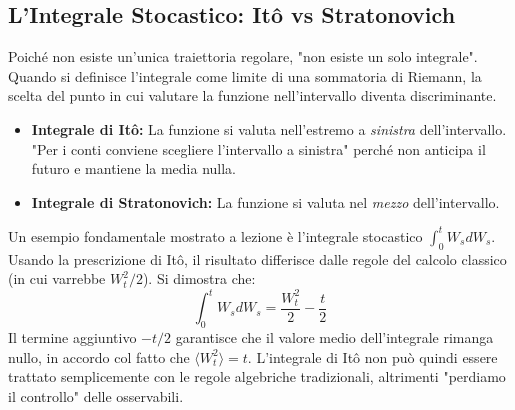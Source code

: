 \documentclass[12pt,a4paper]{article}
\begin{document}
\subsection{L'Integrale Stocastico: Itô vs Stratonovich}
Poiché non esiste un'unica traiettoria regolare, "non esiste un solo integrale". Quando si definisce l'integrale come limite di una sommatoria di Riemann, la scelta del punto in cui valutare la funzione nell'intervallo diventa discriminante.
\begin{itemize}
    \item \textbf{Integrale di Itô:} La funzione si valuta nell'estremo a \textit{sinistra} dell'intervallo. "Per i conti conviene scegliere l'intervallo a sinistra" perché non anticipa il futuro e mantiene la media nulla.
    \item \textbf{Integrale di Stratonovich:} La funzione si valuta nel \textit{mezzo} dell'intervallo.
\end{itemize}
Un esempio fondamentale mostrato a lezione è l'integrale stocastico $\int_0^t W_s dW_s$. Usando la prescrizione di Itô, il risultato differisce dalle regole del calcolo classico (in cui varrebbe $W_t^2/2$). Si dimostra che:
\begin{equation}
\int_0^t W_s dW_s = \frac{W_t^2}{2} - \frac{t}{2}
\end{equation}
Il termine aggiuntivo $-t/2$ garantisce che il valore medio dell'integrale rimanga nullo, in accordo col fatto che $\langle W_t^2 \rangle = t$. L'integrale di Itô non può quindi essere trattato semplicemente con le regole algebriche tradizionali, altrimenti "perdiamo il controllo" delle osservabili.
\end{document}
